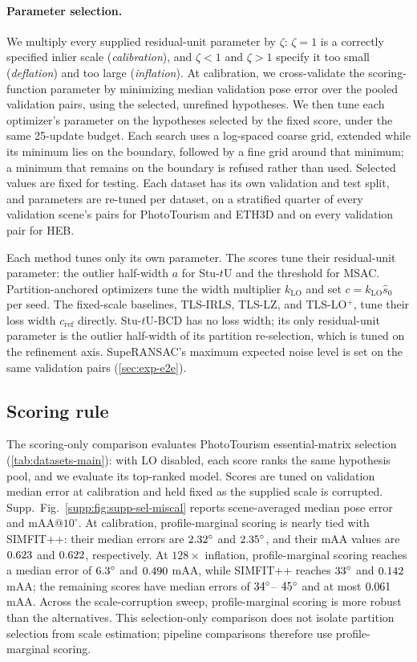 \documentclass[runningheads]{llncs}
\newcommand{\suppfig}[1]{Supp.\ Fig.~\ref{supp:#1}}
\newcommand{\stuU}{Stu-$t$U}          %
\newcommand{\tlsirls}{TLS-IRLS}   %
\newcommand{\klo}{k_{\mathrm{LO}}}
\begin{document}
\paragraph{Parameter selection.}
We multiply every supplied residual-unit parameter by $\zeta$: $\zeta=1$ is
a correctly specified inlier scale (\emph{calibration}), and $\zeta<1$ and
$\zeta>1$ specify it too small (\emph{deflation}) and too large
(\emph{inflation}). At calibration, we cross-validate the scoring-function parameter by minimizing
median validation pose error over the pooled validation pairs, using the
selected, unrefined hypotheses. We then tune each optimizer's parameter on
the hypotheses selected by the fixed score, under the same 25-update budget.
Each search uses a log-spaced coarse grid, extended while its minimum lies
on the boundary, followed by a fine grid around that minimum; a minimum that
remains on the boundary is refused rather than used. Selected values are
fixed for testing.
Each dataset has its own validation and test split, and parameters are
re-tuned per dataset, on a stratified quarter of every validation scene's
pairs for PhotoTourism and ETH3D and on every validation pair for HEB.

Each method tunes only its own parameter. The scores tune their
residual-unit parameter: the outlier half-width $a$ for \stuU{} and the
threshold for MSAC. Partition-anchored optimizers tune the width multiplier
$\klo$ and set $c=\klo\hat s_0$ per seed. The fixed-scale baselines,
\tlsirls{}, TLS-LZ, and TLS-LO$^+$, tune their loss width
$c_{\mathrm{ref}}$ directly. \stuU{}-BCD has no loss width; its only
residual-unit parameter is the outlier half-width of its partition
re-selection, which is tuned on the refinement axis. SupeRANSAC's maximum expected noise level is set on the same
validation pairs (\cref{sec:exp-e2e}).

\subsection{Scoring rule}
The scoring-only comparison evaluates PhotoTourism essential-matrix selection
(\cref{tab:datasets-main}): with LO disabled, each score ranks the same
hypothesis pool, and we evaluate its top-ranked model. Scores are tuned on
validation median error at calibration and held fixed as the supplied scale is
corrupted. \suppfig{fig:supp-sel-miscal} reports scene-averaged median pose
error and mAA@$10^\circ$. At calibration, profile-marginal scoring is
nearly tied with SIMFIT++: their median errors are
$2.32^\circ$ and $2.35^\circ$, and their mAA values are $0.623$ and $0.622$,
respectively. At $128\times$ inflation, profile-marginal scoring reaches a
median error of $6.3^\circ$ and $0.490$ mAA, while SIMFIT++ reaches $33^\circ$
and $0.142$ mAA; the remaining scores have median errors of $34^\circ$--
$45^\circ$ and at most $0.061$ mAA. Across the scale-corruption sweep,
profile-marginal scoring is more robust than the alternatives.
This selection-only comparison does not isolate partition selection from
scale estimation; pipeline comparisons therefore use profile-marginal scoring.
\end{document}
